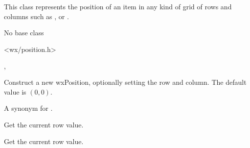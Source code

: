 
\section{}\label{wxposition}

This class represents the position of an item in any kind of grid of rows and
columns such as , or
.


No base class


<wx/position.h>


, 



\label{wxpositionwxposition}



Construct a new wxPosition, optionally setting the row and column. The
default value is $(0, 0)$.


\label{wxpositiongetcol}


A synonym for .


\label{wxpositiongetcolumn}


Get the current row value.


\label{wxpositiongetrow}


Get the current row value.


